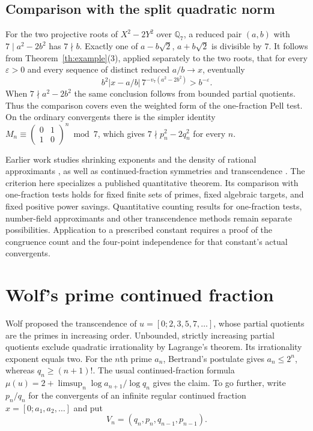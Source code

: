 \documentclass[11pt,a4paper]{article}
\newcommand{\Q}{\mathbb Q}\newcommand{\Z}{\mathbb Z}\newcommand{\PP}{\mathbb P}\newcommand{\SL}{\mathrm{SL}}
\begin{document}
\subsection{Comparison with the split quadratic norm}
For the two projective roots of \(X^2-2Y^2\) over \(\Q_7\), a reduced pair \((a,b)\) with \(7\mid a^2-2b^2\) has \(7\nmid b\). Exactly one of \(a-b\sqrt2\), \(a+b\sqrt2\) is divisible by \(7\). It follows from Theorem~\ref{th:example}(3), applied separately to the two roots, that for every \(\varepsilon>0\) and every sequence of distinct reduced \(a/b\to x\), eventually
\[
 b^2|x-a/b|\,7^{-v_7(a^2-2b^2)}>b^{-\varepsilon}.
\]
When \(7\nmid a^2-2b^2\) the same conclusion follows from bounded partial quotients. Thus the comparison covers even the weighted form of the one-fraction Pell test. On the ordinary convergents there is the simpler identity \(M_n\equiv\left(\begin{smallmatrix}0&1\\1&0\end{smallmatrix}\right)^n\bmod7\), which gives \(7\nmid p_n^2-2q_n^2\) for every \(n\).

Earlier work studies shrinking exponents and the density of rational approximants \cite{bug2007}, as well as continued-fraction symmetries and transcendence \cite{ab}. The criterion here specializes a published quantitative theorem. Its comparison with one-fraction tests holds for fixed finite sets of primes, fixed algebraic targets, and fixed positive power savings. Quantitative counting results for one-fraction tests, number-field approximants and other transcendence methods remain separate possibilities. Application to a prescribed constant requires a proof of the congruence count and the four-point independence for that constant's actual convergents.

\section{Wolf's prime continued fraction}\label{sec:wolf}
Wolf \cite{wolf} proposed the transcendence of \(u=[0;2,3,5,7,\ldots]\), whose partial quotients are the primes in increasing order. Unbounded, strictly increasing partial quotients exclude quadratic irrationality by Lagrange's theorem. Its irrationality exponent equals two. For the $n$th prime $a_n$, Bertrand's postulate gives $a_n\le 2^n$, whereas $q_n\ge (n+1)!$. The usual continued-fraction formula $\mu(u)=2+\limsup_n\log a_{n+1}/\log q_n$ gives the claim. To go further, write \(p_n/q_n\) for the convergents of an infinite regular continued fraction \(x=[0;a_1,a_2,\ldots]\) and put
\[
V_n=(q_n,p_n,q_{n-1},p_{n-1}).
\]
\end{document}
